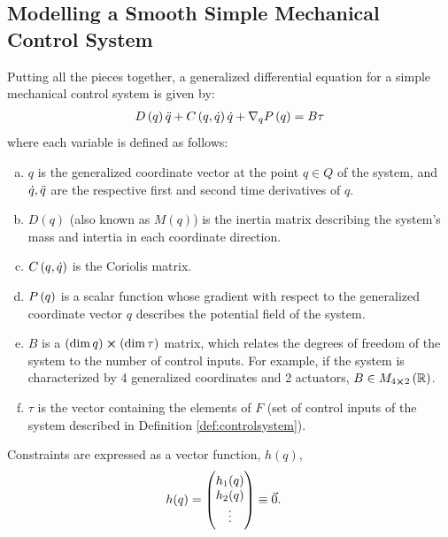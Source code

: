 \documentclass[main.tex]{subfiles}
\begin{document}
\subsection{Modelling a Smooth Simple Mechanical Control System}
Putting all the pieces together, a generalized differential equation for a simple mechanical control system is given by:
\begin{align}
    D\del{ q}\qdd+C\del{ q,\qd}\qd+\nabla_qP\del{ q}=B\tau\label{control-equation}
\end{align}
where each variable is defined as follows:%
\begin{enumerate}[(a)]
    \item $q$ is the generalized coordinate vector at the point $q\in Q$ of the system, and $\dot q,\ddot q$ are the respective first and second time derivatives of $q$.
    \item $D(q)$ (also known as $M(q)$) is the inertia matrix describing the system's mass and intertia in each coordinate direction.
    \item $C\del{q,\qd}$ is the Coriolis matrix.
    \item $P\del{q}$ is a scalar function whose gradient with respect to the generalized coordinate vector $q$ describes the potential field of the system.
    \item $B$ is a $\del{\dim q }\cross\del{ \dim \tau}$ matrix, which relates the degrees of freedom of the system to the number of control inputs. For example, if the system is characterized by 4 generalized coordinates and 2 actuators, $B\in M_{4\cross 2}\del{\ree}$.
    \item $\tau$ is the vector containing the elements of $F$ (set of control inputs of the system described in Definition \ref{def:controlsystem}).
\end{enumerate}
Constraints are expressed as a vector function, ${h}(q)$,
    \begin{align}
        {h}(q)&=\pmqty{h_1(q)\\h_2(q)\\\vdots}\equiv \vec{0}.
    \end{align}
\end{document}
